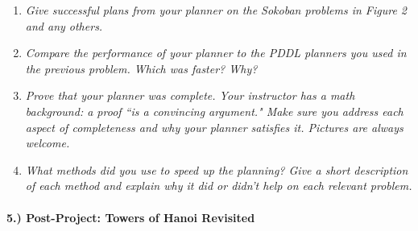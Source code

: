 \documentclass{article}
\begin{document}
\begin{enumerate}
\item{\textit{Give successful plans from your planner on the Sokoban problems in Figure 2 and any others.\\}}
\item{\textit{Compare the performance of your planner to the PDDL planners you used in the previous problem. Which was faster? Why?\\}}
\item{\textit{Prove that your planner was complete. Your instructor has a math background: a proof ``is a convincing argument." Make sure you address each aspect of completeness and why your planner satisfies it. Pictures are always welcome.\\}}
\item{\textit{What methods did you use to speed up the planning? Give a short description of each method and explain why it did or didn’t help on each relevant problem.\\}}
\end{enumerate}

\paragraph{5.) Post-Project: Towers of Hanoi Revisited}
\end{document}
